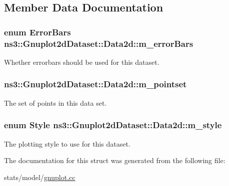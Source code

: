 \subsection{Member Data Documentation}
\subsubsection[{\texorpdfstring{m\+\_\+error\+Bars}{m_errorBars}}]{\setlength{\rightskip}{0pt plus 5cm}enum {\bf Error\+Bars} ns3\+::\+Gnuplot2d\+Dataset\+::\+Data2d\+::m\+\_\+error\+Bars}\hypertarget{structns3_1_1Gnuplot2dDataset_1_1Data2d_a39e295cad8ca25ee7ab6bf2f01fc5286}{}\label{structns3_1_1Gnuplot2dDataset_1_1Data2d_a39e295cad8ca25ee7ab6bf2f01fc5286}


Whether errorbars should be used for this dataset. 

\subsubsection[{\texorpdfstring{m\+\_\+pointset}{m_pointset}}]{ ns3\+::\+Gnuplot2d\+Dataset\+::\+Data2d\+::m\+\_\+pointset}\hypertarget{structns3_1_1Gnuplot2dDataset_1_1Data2d_a7c940c3af73df4caef586555be6478fa}{}\label{structns3_1_1Gnuplot2dDataset_1_1Data2d_a7c940c3af73df4caef586555be6478fa}


The set of points in this data set. 

\subsubsection[{\texorpdfstring{m\+\_\+style}{m_style}}]{\setlength{\rightskip}{0pt plus 5cm}enum {\bf Style} ns3\+::\+Gnuplot2d\+Dataset\+::\+Data2d\+::m\+\_\+style}\hypertarget{structns3_1_1Gnuplot2dDataset_1_1Data2d_ad14f88e14259c14982ac1055020782e3}{}\label{structns3_1_1Gnuplot2dDataset_1_1Data2d_ad14f88e14259c14982ac1055020782e3}


The plotting style to use for this dataset. 



The documentation for this struct was generated from the following file\+:\begin{DoxyCompactItemize}
\item 
stats/model/\hyperlink{gnuplot_8cc}{gnuplot.\+cc}\end{DoxyCompactItemize}
